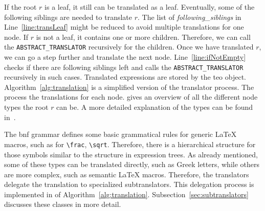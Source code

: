 \documentclass[a4paper,11pt]{article}
\theoremstyle{defTheoStyle}
\theoremstyle{defExampStyle}
\begin{document}
If the root $r$ is a leaf, it still can be translated as a leaf. Eventually, some of the following siblings are needed to translate $r$. The list of \textit{following\_siblings} in Line~\ref{line:transLeaf} might be reduced to avoid multiple translations for one node. If $r$ is not a leaf, it contains one or more children. Therefore, we can call the {\footnotesize \verb|ABSTRACT_TRANSLATOR|} recursively for the children. Once we have translated $r$, we can go a step further and translate the next node. Line~\ref{line:ifNotEmpty} checks if there are following siblings left and calls the {\footnotesize \verb|ABSTRACT_TRANSLATOR|} recursively in such cases. Translated expressions are stored by the \gls*{teo} object. Algorithm~\ref{alg:translation} is a simplified version of the translator process. The  process the translations for each node.  gives an overview of all the different node types the root $r$ can be. A more detailed explanation of the types can be found in~\parencite{POM-Tagger}.

The \gls*{bnf} grammar defines some basic grammatical rules for generic \LaTeX{} macros, such as for \verb|\frac|, \verb|\sqrt|. Therefore, there is a hierarchical structure for those symbols similar to the structure in expression trees. As already mentioned, some of these types can be translated directly, such as Greek letters, while others are more complex, such as semantic \LaTeX{} macros. Therefore, the translators delegate the translation to specialized subtranslators. This delegation process is implemented in  of Algorithm~\ref{alg:translation}.  
Subsection~\ref{sec:subtranslators} discusses these classes in more detail.
\end{document}
